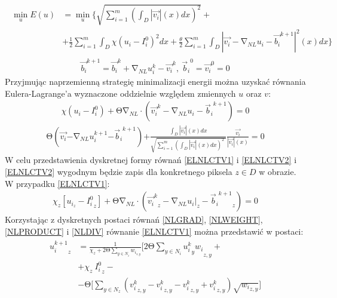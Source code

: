 \documentclass[12pt, twoside, openany]{report}
\theoremstyle{definition}
\begin{document}
\begin{align}
\begin{aligned}
\mathop{\mathrm{min}}_{u}E\left(u\right) &= \mathop{\mathrm{min}}_{u}\Biggl\{\sqrt{\sum^m_{i=1}{{\left(\int_D{\left|\overrightarrow{v_i}\right|(x)}dx\right)}^2}}+\\ 
&+\frac{1}{2}\sum^m_{i=1}{\int_D{ \chi {\left(u_i-I^0_i\right)}^2}dx} 
+\frac{\theta }{2}\sum^m_{i=1}{\int_D{{\left|\overrightarrow{v_i}-{\mathrm{\nabla }}_{NL}u_i- {\overrightarrow{b_i}}^{k+1}\right|}^2\left(x\right)}dx}\Biggr\}
\end{aligned}
\label{ENLCTV1}
\end{align}
\begin{align}
{\overrightarrow{b_i}}^{k+1}={\overrightarrow{b_i}}^k+{\mathrm{\nabla }}_{NL}u^k_i-{\overrightarrow{v_i}}^k,\ {{\overrightarrow{b}}_i}^0={\overrightarrow{v_i}}^0=0
\label{ENLCTV2}
\end{align}
Przyjmując naprzemienną strategię minimalizacji energii można uzyskać równania Eulera-Lagrange’a wyznaczone oddzielnie względem zmiennych $u$ oraz $v$:
\begin{align}
\chi \left(u_i-I^0_i\right)+\mathrm{\Theta }{\mathrm{\nabla }}_{NL}\cdot \left({\overrightarrow{v_i}}^k-{\mathrm{\nabla }}_{NL}u_i-{{\overrightarrow{b}}_i}^{k+1}\right)=0
\label{ELNLCTV1}
\end{align}
\begin{align}
\mathrm{\Theta }\left(\overrightarrow{v_i}\mathrm{-}{\mathrm{\nabla }}_{NL}u^{k+1}_i\mathrm{-}{{\overrightarrow{b}}_i}^{k+1}\right)\mathrm{+}\frac{\int_D{\left|\overrightarrow{v_i}\right|(x)}dx}{\sqrt{\sum^m_{i=1}{{\left(\int_D{\left|\overrightarrow{v_i}\right|(x)}dx\right)}^2}\ }}\frac{\overrightarrow{v_i}}{\left|\overrightarrow{v_i}\right|(x)}\mathrm{=0}
\label{ELNLCTV2}
\end{align}
W celu przedstawienia dyskretnej formy równań \eqref{ELNLCTV1} i  \eqref{ELNLCTV2} i \eqref{ELNLCTV2} wygodnym będzie zapis dla konkretnego piksela $z\in D$ w obrazie. W przypadku \eqref{ELNLCTV1}: 
\begin{align}
\chi_z \left[u_{i_z}-{I^0_i}_z\right]+\mathrm{\Theta}{\mathrm{\nabla}}_{NL}\cdot \left({{\overrightarrow{v_i}}^k}_z-{{\mathrm{\nabla}}_{NL}u_i}\big|_z-{{{\overrightarrow{b}}_i}^{k+1}}_z\right)=0
\label{DELNLCTV1}
\end{align}
Korzystając z dyskretnych postaci równań \eqref{NLGRAD}, \eqref{NLWEIGHT}, \eqref{NLPRODUCT} i \eqref{NLDIV} równanie \eqref{ELNLCTV1} można przedstawić w postaci:
\begin{align}
\begin{aligned}
{u^{k+1}_i}_{z} &= \frac{1}{\chi_z+2\mathrm{\Theta} \sum\limits_{y\in N_i} w_{i_{z,y}}} \Biggl[2\mathrm{\Theta }\sum_{y\in N_i} {{{u^k_i}_y w_i}_{z,y}}+\\
&+ \chi_z \ {I^0_i}_z -\\
&-\mathrm{\Theta} \Biggl[\sum_{y\in N_z} \left({ v^k_i}_{z,y} - { v^k_i}_{z,y} - { v^k_i}_{z,y} + { v^k_i}_{z,y}\right) \sqrt{{w_i}_{z,y}} \Biggr]
\end{aligned}
\label{uNLCTV}
\end{align}
\end{document}
